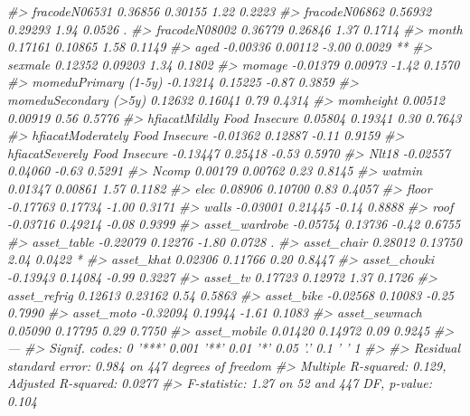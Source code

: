 \documentclass[12pt, krantz2,]{krantz}
\newenvironment{Shaded}{\begin{snugshade}}{\end{snugshade}}
\newcommand{\CommentTok}[1]{\textcolor[rgb]{0.37,0.37,0.37}{\textit{#1}}}
\theoremstyle{definition}
\theoremstyle{definition}
\theoremstyle{definition}
\newcommand{\1}{\mathbbm{1}}
\begin{document}
\begin{Shaded}
\begin{Highlighting}[]
\CommentTok{#> fracodeN06531                    0.36856    0.30155    1.22   0.2223   }
\CommentTok{#> fracodeN06862                    0.56932    0.29293    1.94   0.0526 . }
\CommentTok{#> fracodeN08002                    0.36779    0.26846    1.37   0.1714   }
\CommentTok{#> month                            0.17161    0.10865    1.58   0.1149   }
\CommentTok{#> aged                            -0.00336    0.00112   -3.00   0.0029 **}
\CommentTok{#> sexmale                          0.12352    0.09203    1.34   0.1802   }
\CommentTok{#> momage                          -0.01379    0.00973   -1.42   0.1570   }
\CommentTok{#> momeduPrimary (1-5y)            -0.13214    0.15225   -0.87   0.3859   }
\CommentTok{#> momeduSecondary (>5y)            0.12632    0.16041    0.79   0.4314   }
\CommentTok{#> momheight                        0.00512    0.00919    0.56   0.5776   }
\CommentTok{#> hfiacatMildly Food Insecure      0.05804    0.19341    0.30   0.7643   }
\CommentTok{#> hfiacatModerately Food Insecure -0.01362    0.12887   -0.11   0.9159   }
\CommentTok{#> hfiacatSeverely Food Insecure   -0.13447    0.25418   -0.53   0.5970   }
\CommentTok{#> Nlt18                           -0.02557    0.04060   -0.63   0.5291   }
\CommentTok{#> Ncomp                            0.00179    0.00762    0.23   0.8145   }
\CommentTok{#> watmin                           0.01347    0.00861    1.57   0.1182   }
\CommentTok{#> elec                             0.08906    0.10700    0.83   0.4057   }
\CommentTok{#> floor                           -0.17763    0.17734   -1.00   0.3171   }
\CommentTok{#> walls                           -0.03001    0.21445   -0.14   0.8888   }
\CommentTok{#> roof                            -0.03716    0.49214   -0.08   0.9399   }
\CommentTok{#> asset_wardrobe                  -0.05754    0.13736   -0.42   0.6755   }
\CommentTok{#> asset_table                     -0.22079    0.12276   -1.80   0.0728 . }
\CommentTok{#> asset_chair                      0.28012    0.13750    2.04   0.0422 * }
\CommentTok{#> asset_khat                       0.02306    0.11766    0.20   0.8447   }
\CommentTok{#> asset_chouki                    -0.13943    0.14084   -0.99   0.3227   }
\CommentTok{#> asset_tv                         0.17723    0.12972    1.37   0.1726   }
\CommentTok{#> asset_refrig                     0.12613    0.23162    0.54   0.5863   }
\CommentTok{#> asset_bike                      -0.02568    0.10083   -0.25   0.7990   }
\CommentTok{#> asset_moto                      -0.32094    0.19944   -1.61   0.1083   }
\CommentTok{#> asset_sewmach                    0.05090    0.17795    0.29   0.7750   }
\CommentTok{#> asset_mobile                     0.01420    0.14972    0.09   0.9245   }
\CommentTok{#> ---}
\CommentTok{#> Signif. codes:  0 '***' 0.001 '**' 0.01 '*' 0.05 '.' 0.1 ' ' 1}
\CommentTok{#> }
\CommentTok{#> Residual standard error: 0.984 on 447 degrees of freedom}
\CommentTok{#> Multiple R-squared:  0.129,  Adjusted R-squared:  0.0277 }
\CommentTok{#> F-statistic: 1.27 on 52 and 447 DF,  p-value: 0.104}
\end{Highlighting}
\end{Shaded}
\end{document}
